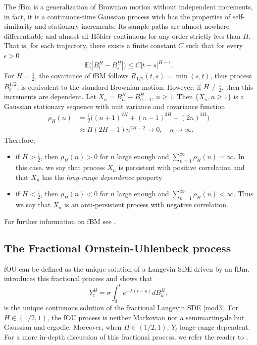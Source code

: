 \documentclass[smallextended]{svjour3}
\newcommand{\E}{\mathbb{E}}
\begin{document}
        The fBm is a generalization of Brownian motion without independent 
    increments, in fact,  it is a continuous-time Gaussian process wich
    has the properties of self-similarity and stationary increments. Its 
    sample-paths are almost nowhere differentiable and
    almost-all H\"{o}lder continuous for any order strictly less than $H$. That 
    is, for each trajectory, there exists a finite constant $C$ such that for 
    every$\epsilon > 0$
    \[
        \E \big(
            | B_t ^ H - B_s ^ H|
        \big)
        \le
        C |t - s| ^ {H - \epsilon} .
    \]
%
    For $H = \tfrac{1}{2} $, the covariance of fBM follows
    $
        R_{1 / 2} (t, s)
            = \min(s, t)
    $, thus process $B_t ^ {1 / 2}$, is equivalent to
    the standard Brownian motion. However, if $H \ne \tfrac{1}{2}$, 
    then this increments are dependent.
%
        Let  $X_n = B_n ^ H - B_{n - 1} ^ H$, $n \ge 1$.
    Then $\{X_n, n \ge 1\}$ is a Gaussian stationary sequence with unit
    variance and covariance function 
    \begin{align*}
        \rho_H (n) &=
            \frac{1}{2}
            \Big(
                (n + 1) ^ {2 H} + (n - 1) ^ {2 H}
                - (2 n) ^{2 H}
            \Big)
            \\
            &\approx
            H (2H - 1)n^{2H-2} \to 0, \quad n \to \infty.
    \end{align*}
    Therefore,
    \begin{itemize}
        \item
            if $H > \tfrac{1}{2}$, then $\rho_H(n) > 0$ for $n$ large enough and
            $\sum_{n=1}^\infty \rho_H(n)=\infty$. In this case, we say that
            process $X_n$ is persistent with positive correlation and that
            $X_n$ has the \emph{long-range dependence} property
        \item
            if $H < \tfrac{1}{2}$, then $\rho_H(n) < 0$ for $n$ large enough and
            $\sum_{n=1}^\infty \rho_H(n)<\infty$. Thus we say that $X_n$ is an 
            anti-persistent process with negative correlation.
    \end{itemize}
    For further information on fBM see \cite{ra,nu,mi}.
    
    \subsection{The Fractional Ornstein-Uhlenbeck process}\label{sect-OU}
        fOU can be defined as the unique solution of a Langevin SDE driven by
    an fBm.\citeauthor{ch-ka-ma} introduces this fractional process and shows 
    that 
     \begin{equation}
        Y_t ^ H = 
            \sigma \int_0 ^ t e ^ {-\lambda(t - u)} dB_u^H, 
        \label{mod4}
    \end{equation}
    is the unique continuous solution of the fractional Langevin SDE 
    \eqref{mod3}.
    For $H \in (1/2,1)$, the fOU process is neither Markovian 
    nor a semimartingale but 
    Gaussian and ergodic. Moreover, when $H \in(1/2,1)$, $Y_t$ longe-range 
    dependent. For a more in-depth discussion of this fractional process, we 
    refer the reader to \citet{ch-ka-ma,ra, du-no}.
\end{document}
